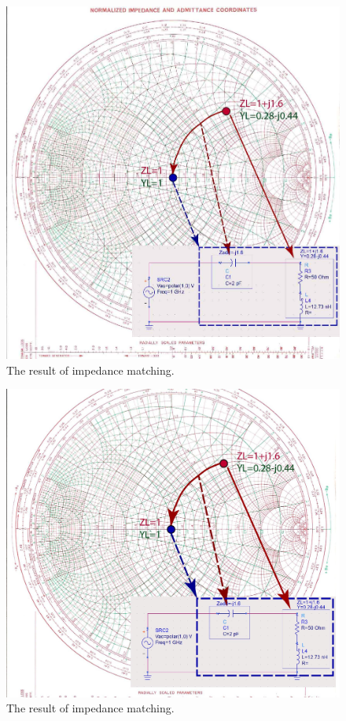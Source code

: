 \documentclass{ximera}
\begin{document}
\begin{figure}[htbp]
\begin{center}
\includegraphics[scale=0.4]{../jpg/SimpleMatch-01small.jpg}
\end{center}
\caption{The result of impedance matching.}
\label{fig:SimpleMatch}
\end{figure}



\begin{figure}[htbp]
\begin{center}
\includegraphics[scale=0.4]{../jpg/SimpleMatchSmaller-01.jpg}
\end{center}
\caption{The result of impedance matching.}
\label{fig:SimpleMatch}
\end{figure}
\end{document}
